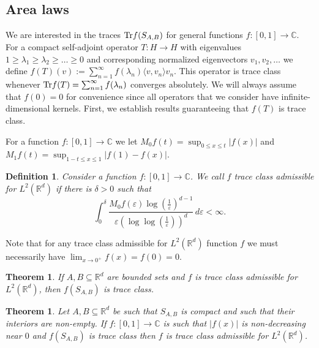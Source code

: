 \documentclass[12pt]{amsart}
\numberwithin{equation}{section}
\newcommand{\R}{\mathbb{R}}
\newcommand{\Cm}{\mathbb{C}}
\newcommand{\eps}{\varepsilon}
\newtheorem{theorem}[Thm]{Theorem}
\newtheorem{definition}{Definition}
\begin{document}
\subsection{Area laws} We are interested in the traces ${\rm Tr} f(S_{A,B})$ for general functions $f:[0,1] \to \Cm$. For a compact self-adjoint operator $T:H\to H$ with eigenvalues $1 \ge\lambda_1\ge \lambda_2 \ge \ldots \ge 0$ and corresponding normalized eigenvectors $v_1, v_2, \ldots$ we define $f(T)(v) := \sum_{n=1}^\infty f(\lambda_n) \langle v, v_n\rangle v_n$. This operator is trace class whenever ${\rm Tr} f(T) = \sum_{n=1}^\infty f(\lambda_n)$  converges absolutely. We will always assume that $f(0) = 0$ for convenience since all operators that we consider have infinite-dimensional kernels. First, we establish results guaranteeing that $f(T)$ is trace class. 

For a function $f:[0, 1]\to \Cm$ we let $M_0 f(t) = \sup_{0 \le x \le t}|f(x)|$ and $M_1 f(t) = \sup_{1-t \le x \le 1}|f(1)-f(x)|$.
\begin{definition}
Consider a function $f:[0,1] \to \Cm$. We call $f$ trace class admissible for $L^2(\R^d)$ if there is $\delta>0$ such that
\begin{equation}\label{trace class condition}
\int_0^{\delta} \frac{M_0 f(\eps) \log\left(\frac{1}{\eps}\right)^{d-1}}{\eps\left(\log\log\left(\frac{1}{\eps}\right)\right)^d} \, d\eps < \infty. 
\end{equation}
\end{definition}
Note that for any trace class admissible for $L^2(\R^d)$ function $f$ we must necessarily have $\lim_{x\to 0^+} f(x) = f(0)=0$.



\begin{theorem}\label{trace class sufficient}
If $A, B\subseteq \R^d$ are bounded sets and $f$ is trace class admissible for $L^2(\R^d)$, then $f(S_{A,B})$ is trace class.
\end{theorem}

\begin{theorem}\label{trace class necessary}
Let $A, B\subseteq \R^d$ be such that $S_{A,B}$ is compact and such that their interiors are non-empty. If $f:[0,1]\to\Cm$ is such that $|f(x)|$ is non-decreasing near $0$ and $f(S_{A,B})$ is trace class then $f$ is trace class admissible for $L^2(\R^d)$.
\end{theorem}
\end{document}
